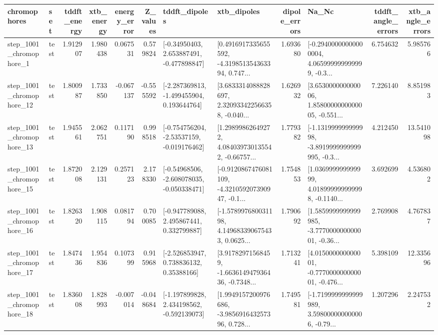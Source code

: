 \begin{tabular}{llrrrrllrlrr}
\toprule
             chromophores &       set &  tddft\_energy &  xtb\_energy &  energy\_error &  Z\_values &                               tddft\_dipoles &                                        xtb\_dipoles &  dipole\_errors &                                              Na\_Nc &  tddft\_angle\_errors &  xtb\_angle\_errors \\
\midrule
  step\_1001\_chromophore\_1 &      test &      1.912907 &    1.980438 &      0.067531 &  0.579824 &    [-0.34950403, 2.653887491, -0.477898847] &  [0.4916917335655592, -4.319851354363394, 0.747... &       1.693680 &  [-0.29400000000000004, 4.065999999999999, -0.3... &            6.754632 &          5.985766 \\
 step\_1001\_chromophore\_12 &      test &      1.800987 &    1.733850 &     -0.067137 & -0.555592 &   [-2.287369813, -1.499455904, 0.193644764] &  [3.6833314088828697, 2.320933422566358, -0.040... &       1.626932 &  [3.653000000000006, 1.8580000000000005, -0.551... &            7.226140 &          8.851983 \\
 step\_1001\_chromophore\_13 &      test &      1.945561 &    2.062751 &      0.117190 &  0.998518 &   [-0.754756204, -2.53537159, -0.019176462] &  [1.29899862649272, 4.084039730135542, -0.66757... &       1.779382 &  [-1.131999999999998, -3.8919999999999995, -0.3... &            4.212450 &         13.541098 \\
 step\_1001\_chromophore\_15 &      test &      1.872008 &    2.129131 &      0.257123 &  2.178330 &   [-0.54968506, -2.608078035, -0.050338471] &  [-0.9120867476081109, -4.321059207390947, -0.1... &       1.754853 &  [1.036999999999999, 4.018999999999998, -0.1140... &            3.692699 &          4.536802 \\
 step\_1001\_chromophore\_16 &      test &      1.826320 &    1.908115 &      0.081794 &  0.700085 &    [-0.947789088, 2.495867441, 0.332799887] &  [-1.578997680031198, 4.149683390675433, 0.0625... &       1.790692 &  [1.5859999999999985, -3.777000000000001, -0.36... &            2.769908 &          4.767837 \\
 step\_1001\_chromophore\_17 &      test &      1.847436 &    1.954836 &      0.107399 &  0.915968 &     [-2.526853947, 0.738836132, 0.35388166] &  [3.91782971568459, -1.663614947936436, -0.7348... &       1.713241 &  [4.015000000000001, -0.777000000000001, -0.476... &            5.398109 &         12.335696 \\
 step\_1001\_chromophore\_18 &      test &      1.836008 &    1.828993 &     -0.007014 & -0.048684 &   [-1.197899828, 2.434198562, -0.592139073] &  [1.9949157200976686, -3.985691643257396, 0.728... &       1.749581 &  [-1.7199999999999989, 3.598000000000006, -0.79... &            1.207296 &          2.247532 \\

\end{tabular}
